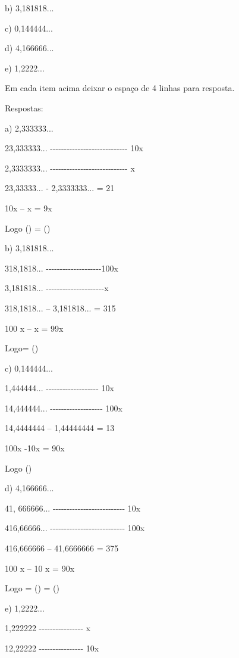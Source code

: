 b) 3,181818...

c) 0,144444...

d) 4,166666...

e) 1,2222...

Em cada item acima deixar o espaço de 4 linhas para resposta.

Respostas:

a) 2,333333...

23,333333...
-\/-\/-\/-\/-\/-\/-\/-\/-\/-\/-\/-\/-\/-\/-\/-\/-\/-\/-\/-\/-\/-\/-\/-\/-\/-\/-\/-
10x

2,3333333...
-\/-\/-\/-\/-\/-\/-\/-\/-\/-\/-\/-\/-\/-\/-\/-\/-\/-\/-\/-\/-\/-\/-\/-\/-\/-\/-\/-
x

23,33333... - 2,3333333... = 21

10x -- x = 9x

Logo () = ()

b) 3,181818...

318,1818...
-\/-\/-\/-\/-\/-\/-\/-\/-\/-\/-\/-\/-\/-\/-\/-\/-\/-\/-\/-100x

3,181818...
-\/-\/-\/-\/-\/-\/-\/-\/-\/-\/-\/-\/-\/-\/-\/-\/-\/-\/-\/-\/-x

318,1818... -- 3,181818... = 315

100 x -- x = 99x

Logo= ()

c) 0,144444...

1,444444... -\/-\/-\/-\/-\/-\/-\/-\/-\/-\/-\/-\/-\/-\/-\/-\/-\/-\/- 10x

14,444444... -\/-\/-\/-\/-\/-\/-\/-\/-\/-\/-\/-\/-\/-\/-\/-\/-\/-\/-
100x

14,4444444 -- 1,44444444 = 13

100x -10x = 90x

Logo ()

d) 4,166666...

41, 666666...
-\/-\/-\/-\/-\/-\/-\/-\/-\/-\/-\/-\/-\/-\/-\/-\/-\/-\/-\/-\/-\/-\/-\/-\/-\/-
10x

416,66666...
-\/-\/-\/-\/-\/-\/-\/-\/-\/-\/-\/-\/-\/-\/-\/-\/-\/-\/-\/-\/-\/-\/-\/-\/-\/-\/-
100x

416,666666 -- 41,6666666 = 375

100 x -- 10 x = 90x

Logo = () = ()

e) 1,2222...

1,222222 -\/-\/-\/-\/-\/-\/-\/-\/-\/-\/-\/-\/-\/-\/-\/- x

12,22222 -\/-\/-\/-\/-\/-\/-\/-\/-\/-\/-\/-\/-\/-\/-\/- 10x

